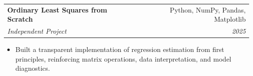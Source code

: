 \documentclass[10pt,letterpaper]{article}
\makeatletter
\newcommand{\resumeEntry}[4]{%
  \begin{tabularx}{\textwidth}{@{}Xr@{}}
    \textbf{#1} & #2 \\
    \textit{#3} & \textit{#4}
  \end{tabularx}%
}
\newenvironment{resumeItems}{%
  \begin{itemize}[
    label=\textbullet,
    leftmargin=14pt,
    labelsep=5pt,
    itemsep=0.5pt,
    topsep=1.0pt,
    parsep=0pt,
    partopsep=0pt
  ]
}{%
  \end{itemize}
}
\makeatother
\begin{document}
\vspace{0.7pt}

\resumeEntry
  {Ordinary Least Squares from Scratch}
  {Python, NumPy, Pandas, Matplotlib}
  {Independent Project}
  {2025}

\begin{resumeItems}
  \item Built a transparent implementation of regression estimation from first principles, reinforcing matrix operations, data interpretation, and model diagnostics.
\end{resumeItems}
\end{document}
